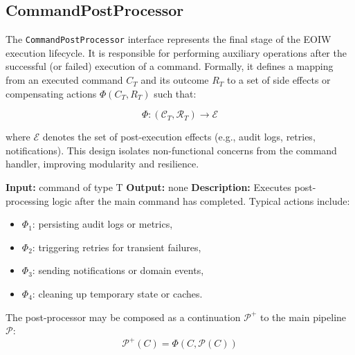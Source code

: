 \subsection{CommandPostProcessor}

The \texttt{CommandPostProcessor} interface represents the final stage of the EOIW execution lifecycle.  
It is responsible for performing auxiliary operations after the successful (or failed) execution of a command.  
Formally, it defines a mapping from an executed command $C_T$ and its outcome $R_T$ to a set of side effects or compensating actions $\Phi(C_T, R_T)$ such that:

\[
\Phi : (\mathcal{C}_T, \mathcal{R}_T) \rightarrow \mathcal{E}
\]

where $\mathcal{E}$ denotes the set of post-execution effects (e.g., audit logs, retries, notifications).  
This design isolates non-functional concerns from the command handler, improving modularity and resilience.

\begin{algorithm}[H]
\caption{CommandPostProcessor (\emph{Interface})}
\begin{algorithmic}[1]
    \State \textbf{Input:} command of type \textlangle T\textrangle
    \State \textbf{Output:} none
    \State \textbf{Description:} 
        Executes post-processing logic after the main command has completed.
        Typical actions include:
        \begin{itemize}
            \item $\Phi_1$: persisting audit logs or metrics,
            \item $\Phi_2$: triggering retries for transient failures,
            \item $\Phi_3$: sending notifications or domain events,
            \item $\Phi_4$: cleaning up temporary state or caches.
        \end{itemize}
        The post-processor may be composed as a continuation $\mathcal{P}^+$ to the main pipeline $\mathcal{P}$:
        \[
            \mathcal{P}^+(C) = \Phi(C, \mathcal{P}(C))
        \]
\EndProcedure
\end{algorithmic}
\end{algorithm}